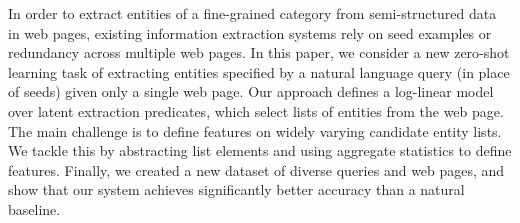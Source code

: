 In order to extract entities of a fine-grained category from semi-structured data in web pages, existing information extraction systems rely on seed examples or redundancy across multiple web pages. In this paper, we consider a new zero-shot learning task of extracting entities specified by a natural language query (in place of seeds) given only a single web page. Our approach defines a log-linear model over latent extraction predicates, which select lists of entities from the web page. The main challenge is to define features on widely varying candidate entity lists. We tackle this by abstracting list elements and using aggregate statistics to define features. Finally, we created a new dataset of diverse queries and web pages, and show that our system achieves significantly better accuracy than a natural baseline.
